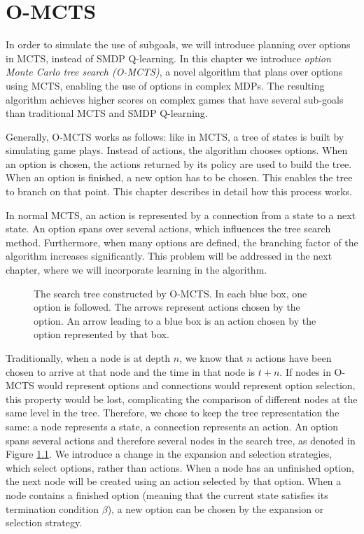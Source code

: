 \chapter{O-MCTS}
\label{sec:planning}


In order to simulate the use of subgoals, we will introduce planning over
options in MCTS, instead of SMDP Q-learning. In this chapter we introduce
\emph{option Monte Carlo tree search (O-MCTS)}, a novel algorithm that plans
over options using MCTS, enabling the use of options in complex MDPs. The
resulting algorithm achieves higher scores on complex games that have several
sub-goals than traditional MCTS and SMDP Q-learning.

Generally, O-MCTS works as follows: like in MCTS, a tree of states is
built by simulating game plays. Instead of actions, the algorithm chooses
options. When an option is chosen, the actions returned by its policy are used
to build the tree. When an option is finished, a new option has to be chosen.
This enables the tree to branch on that point. This chapter describes in detail
how this process works.

In normal MCTS, an action is represented by a connection from a state to a next
state. An option spans over several actions, which influences the tree search
method. Furthermore, when many options are defined, the branching factor of the
algorithm increases significantly. This problem will be addressed in the next
chapter, where we will incorporate learning in the algorithm.

\begin{figure}
	\centering
	\caption{The search tree constructed by O-MCTS. In each blue box, one option
	is followed. The arrows represent actions chosen by the option. An arrow
leading to a blue box is an action chosen by the option represented by that box.}
	\label{fig:omcts-tree}
\end{figure}

Traditionally, when a node is at depth $n$, we know that $n$ actions have been
chosen to arrive at that node and the time in that node is $t+n$. If nodes in
O-MCTS would represent options and connections would represent option selection,
this property would be lost, complicating the comparison of different nodes at
the same level in the tree. Therefore, we chose to keep the tree representation
the same: a node represents a state, a connection represents an action. An
option spans several actions and therefore several nodes in the search tree, as
denoted in Figure \ref{fig:omcts-tree}. We introduce a change in the expansion
and selection strategies, which select options, rather than actions. When a node
has an unfinished option, the next node will be created using an action selected
by that option. When a node contains a finished option (meaning that the current
state satisfies its termination condition $\beta$), a new option can be chosen
by the expansion or selection strategy.

